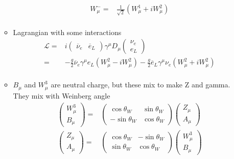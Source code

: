 \begin{itemize}
\begin{itemize}
\begin{equation}
\begin{split}
        W_\mu^-=&\frac{1}{\sqrt{2}}(W_\mu^1+iW_\mu^2) \\
        \end{split}\end{equation}
        \item Lagrangian with some interactions \cite{wells}
        \begin{equation}\begin{split}
        \mathcal{L}=&i\begin{pmatrix}\overline{\nu}_e&\overline{e}_L\end{pmatrix}\gamma^\mu D_\mu \begin{pmatrix}\nu_e\\e_L\end{pmatrix} \\
        =&-\frac{g}{2}\overline{\nu}_e\gamma^\mu e_L(W_\mu^2-iW^2_\mu)-\frac{g}{2}\overline{e}_L\gamma^\mu \nu_e(W_\mu^2+iW^2_\mu) \\
        \end{split}\end{equation}
        \item $B_\mu$ and $W_\mu^3$ are neutral charge, but these mix to make Z and gamma. They mix with Weinberg angle \cite{wells}
        \begin{equation}\begin{split}
        \begin{pmatrix}W^3_\mu\\B_\mu\end{pmatrix}=&\begin{pmatrix}\cos{\theta_W}&\sin{\theta_W}\\-\sin{\theta_W}&\cos{\theta_W}\end{pmatrix} \begin{pmatrix}Z_\mu\\A_\mu\end{pmatrix}\\
        \begin{pmatrix}Z_\mu\\A_\mu\end{pmatrix}=&\begin{pmatrix}\cos{\theta_W}&-\sin{\theta_W}\\\sin{\theta_W}&\cos{\theta_W}\end{pmatrix} \begin{pmatrix}W^3_\mu\\B_\mu\end{pmatrix}
        \end{split}\end{equation}

\end{itemize}
\end{itemize}
